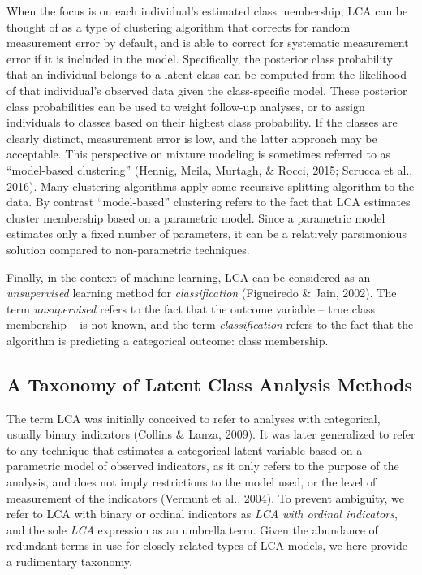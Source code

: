 \documentclass[
  ,man,floatsintext]{apa6}
\begin{document}
When the focus is on each individual's estimated class membership,
LCA can be thought of as a type of clustering algorithm that corrects for random measurement error by default, and is able to correct for systematic measurement error if it is included in the model.
Specifically, the posterior class probability that an individual belongs to a latent class
can be computed from the likelihood of that individual's observed data given the class-specific model.
These posterior class probabilities can be used to weight follow-up analyses,
or to assign individuals to classes based on their highest class probability.
If the classes are clearly distinct, measurement error is low, and the latter approach may be acceptable.
This perspective on mixture modeling is sometimes referred to as ``model-based
clustering'' (Hennig, Meila, Murtagh, \& Rocci, 2015; Scrucca et al., 2016).
Many clustering algorithms apply some recursive splitting algorithm to the data. By
contrast ``model-based'' clustering refers to the fact that LCA estimates
cluster membership based on a parametric model.
Since a parametric model estimates only a fixed number of parameters,
it can be a relatively parsimonious solution compared to non-parametric techniques.

Finally, in the context of machine learning, LCA can be considered as an
\emph{unsupervised} learning method for \emph{classification} (Figueiredo \& Jain, 2002).
The term \emph{unsupervised} refers to the fact that the outcome variable --
true class membership -- is not known, and the term \emph{classification}
refers to the fact that the algorithm is predicting a categorical
outcome: class membership.

\hypertarget{a-taxonomy-of-latent-class-analysis-methods}{%
\subsection{A Taxonomy of Latent Class Analysis Methods}\label{a-taxonomy-of-latent-class-analysis-methods}}

The term LCA was initially conceived to refer to analyses with categorical,
usually binary indicators (Collins \& Lanza, 2009).
It was later generalized to refer to any technique that estimates a categorical latent variable based on a
parametric model of observed indicators, as it only refers
to the purpose of the analysis, and does not imply restrictions to the
model used, or the level of measurement of the indicators (Vermunt et al., 2004).
To prevent ambiguity, we refer to LCA with binary or ordinal indicators as \emph{LCA with ordinal indicators},
and the sole \emph{LCA} expression as an umbrella term.
Given the abundance of redundant terms in use for closely related types of LCA models,
we here provide a rudimentary taxonomy.
\end{document}
